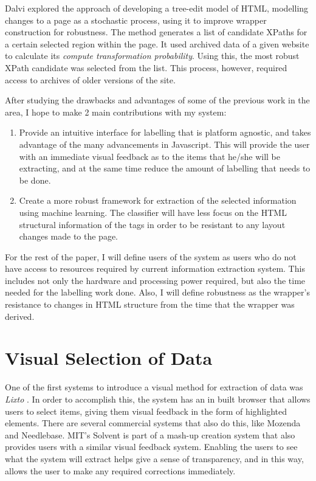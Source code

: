 	Dalvi explored the approach of developing a tree-edit model of HTML, modelling changes to a page as a stochastic process, using it to improve wrapper construction for robustness\cite{Dalvi2009}. The method generates a list of candidate XPaths for a certain selected region within the page. It used archived data of a given website to calculate its \textit{compute transformation probability}. Using this, the most robust XPath candidate was selected from the list. This process, however, required access to archives of older versions of the site.

	After studying the drawbacks and advantages of some of the previous work in the area, I hope to make 2 main contributions with my system:
	\begin{enumerate}
		\item Provide an intuitive interface for labelling that is platform agnostic, and takes advantage of the many advancements in Javascript. This will provide the user with an immediate visual feedback as to the items that he/she will be extracting, and at the same time reduce the amount of labelling that needs to be done.
		\item Create a more robust framework for extraction of the selected information using machine learning. The classifier will have less focus on the HTML structural information of the tags in order to be resistant to any layout changes made to the page.
	\end{enumerate}
	For the rest of the paper, I will define users of the system as users who do not have access to resources required by current information extraction system. This includes not only the hardware and processing power required, but also the time needed for the labelling work done. Also, I will define robustness as the wrapper's resistance to changes in HTML structure from the time that the wrapper was derived.


\section{Visual Selection of Data}
	One of the first systems to introduce a visual method for extraction of data was \textit{Lixto} \cite{Baumgartner2001}. In order to accomplish this, the system has an in built browser that allows users to select items, giving them visual feedback in the form of highlighted elements. There are several commercial systems that also do this, like Mozenda and Needlebase. %
MIT's Solvent is part of a mash-up creation system that also provides users with a similar visual feedback system. Enabling the users to see what the system will extract helps give a sense of transparency, and in this way, allows the user to make any required corrections immediately.

